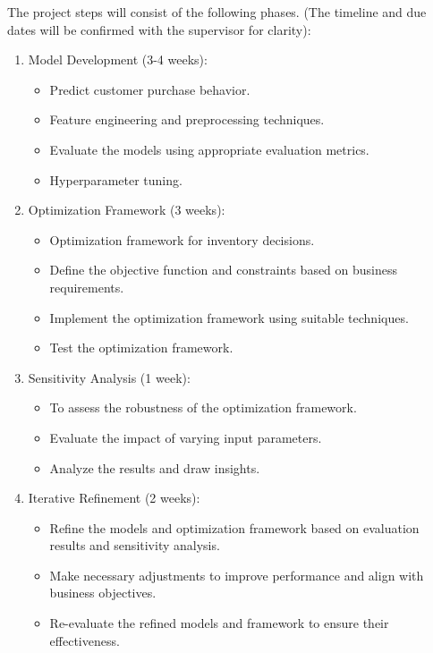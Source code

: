 \documentclass{article}
\begin{document}
The project steps will consist of the following phases. (The timeline and due dates will be confirmed with the supervisor for clarity):

\begin{enumerate}
  \item Model Development (3-4 weeks):
    \begin{itemize}
      \item Predict customer purchase behavior.
      \item Feature engineering and preprocessing techniques.
      \item Evaluate the models using appropriate evaluation metrics.
      \item Hyperparameter tuning.
    \end{itemize}
  \item Optimization Framework (3 weeks):
    \begin{itemize}
      \item Optimization framework for inventory decisions.
      \item Define the objective function and constraints based on business requirements.
      \item Implement the optimization framework using suitable techniques.
      \item Test the optimization framework.
    \end{itemize}
  \item Sensitivity Analysis (1 week):
    \begin{itemize}
      \item To assess the robustness of the optimization framework.
      \item Evaluate the impact of varying input parameters.
      \item Analyze the results and draw insights.
    \end{itemize}
  \item Iterative Refinement (2 weeks):
    \begin{itemize}
      \item Refine the models and optimization framework based on evaluation results and sensitivity analysis.
      \item Make necessary adjustments to improve performance and align with business objectives.
      \item Re-evaluate the refined models and framework to ensure their effectiveness.
    \end{itemize}
\end{enumerate}
\end{document}
